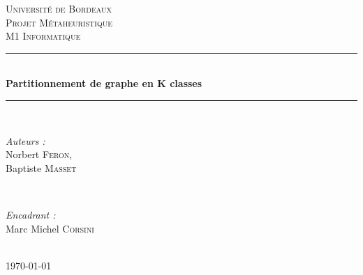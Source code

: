 \documentclass[a4paper]{article}
\begin{document}
\begin{titlepage}
\newcommand{\HRule}{\rule{\linewidth}{0.5mm}} 
\center 
 

\textsc{\LARGE Université de Bordeaux}\\[1.5cm] 
\textsc{\Large Projet Métaheuristique}\\[0.5cm] 
\textsc{\large M1 Informatique}\\[0.5cm] 


\HRule \\[0.4cm]
{ \huge \bfseries Partitionnement de graphe en K classes}\\[0.4cm] %
\HRule \\[1.5cm]
 

\begin{minipage}{0.4\textwidth}
\begin{flushleft} \large
\emph{Auteurs : }\\
Norbert \textsc{Feron},\\
Baptiste \textsc{Masset}
\end{flushleft}
\end{minipage}
~
\begin{minipage}{0.4\textwidth}
\begin{flushright} \large
\emph{Encadrant : } \\
Marc Michel \textsc{Corsini} 
\end{flushright}
\end{minipage}\\[2cm]


{\large \today}\\[2cm]


\end{titlepage}
\end{document}
